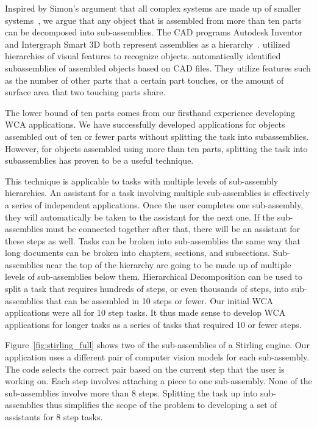 Inspired by Simon's argument that
all complex systems are made up of smaller systems~\cite{Simon1991}, we argue
that any object that is assembled from more than ten parts can be decomposed
into sub-assemblies.
The CAD programs Autodesk Inventor and Intergraph Smart 3D both represent
assemblies as a
hierarchy~\cite{autodesk_hierarchy, intergraph_hierarchy}.
\citet{semantic_hierarchy} utilized hierarchies of visual features to recognize
objects.
\citet{subassembly_identification} automatically identified subassemblies of
assembled objects based on CAD files.
They utilize features such as the number of other parts that a certain part
touches, or the amount of surface area that two touching parts share.

The lower bound of ten parts comes from our firsthand experience developing WCA
applications.
We have successfully developed applications for objects assembled out of ten or
fewer parts without splitting the task into subassemblies.
However, for objects assembled using more than ten parts, splitting the task
into subassemblies has proven to be a useful technique.

This technique is applicable to tasks
with multiple levels of sub-assembly hierarchies.
An assistant for a task involving multiple sub-assemblies is effectively a
series of independent applications. Once the user completes one sub-assembly,
they will automatically be taken to the assistant for the next one.
If the
sub-assemblies must be connected together after that, there will be an assistant
for these steps as well.
Tasks can be broken into sub-assemblies the same way that long documents can be
broken into chapters, sections, and subsections.
Sub-assemblies near the top of the hierarchy are going to be made up of multiple
levels of sub-assemblies below them.
Hierarchical Decomposition can be used to split a task that requires hundreds of
steps, or even thousands of steps, into sub-assemblies that can be assembled in
10 steps or fewer.
Our initial WCA applications were all for 10 step tasks.
It thus made sense to develop WCA applications for longer tasks as a series of
tasks that required 10 or fewer steps.

Figure~\ref{fig:stirling_full} shows two of the sub-assemblies of a Stirling
engine.
Our application uses a different pair of computer vision models for each
sub-assembly.
The code selects the correct pair based on the current step that the user is
working on.
Each step involves attaching a piece to one sub-assembly.
None of the sub-assemblies involve more than 8 steps.
Splitting the task up into sub-assemblies thus simplifies the scope of the
problem to developing a set of assistants for 8 step tasks.

